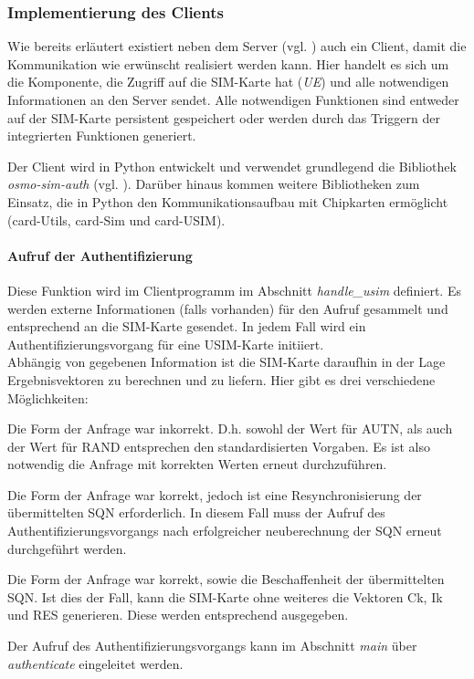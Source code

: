     \subsubsection{Implementierung des Clients}
    Wie bereits erläutert existiert neben dem Server (vgl. ) auch ein Client,
    damit die Kommunikation wie erwünscht realisiert werden kann. Hier handelt es sich um die Komponente,
    die Zugriff auf die SIM-Karte hat (\emph{UE}) und alle notwendigen Informationen an den Server sendet.
    Alle notwendigen Funktionen sind entweder auf der SIM-Karte persistent gespeichert oder werden durch
    das Triggern der integrierten Funktionen generiert.

    Der Client wird in Python entwickelt und verwendet grundlegend die Bibliothek \textit{osmo-sim-auth}
    (vgl. ). Darüber hinaus kommen weitere  Bibliotheken zum Einsatz, die in
    Python den Kommunikationsaufbau mit Chipkarten ermöglicht (card-Utils, card-Sim und card-USIM).

        \paragraph{Aufruf der Authentifizierung} Diese Funktion wird im Clientprogramm im Abschnitt
        \textit{handle\_usim} definiert. Es werden externe Informationen (falls vorhanden) für den Aufruf
        gesammelt und entsprechend an die SIM-Karte gesendet. In jedem Fall wird ein Authentifizierungsvorgang
        für eine USIM-Karte initiiert. \\
        Abhängig von gegebenen Information ist die SIM-Karte daraufhin in der Lage Ergebnisvektoren
        zu berechnen und zu liefern. Hier gibt es drei verschiedene Möglichkeiten:
            \begin{addmargin}[1em]{2em}
            Die Form der Anfrage war inkorrekt. D.h. sowohl der Wert für AUTN, als auch der Wert für RAND entsprechen
            den standardisierten Vorgaben. Es ist also notwendig die Anfrage mit korrekten Werten erneut
            durchzuführen.

            Die Form der Anfrage war korrekt, jedoch ist eine Resynchronisierung der übermittelten SQN erforderlich.
            In diesem Fall muss der Aufruf des Authentifizierungsvorgangs nach erfolgreicher neuberechnung der SQN
            erneut durchgeführt werden.

            Die Form der Anfrage war korrekt, sowie die Beschaffenheit der übermittelten SQN. Ist dies der Fall,
            kann die SIM-Karte ohne weiteres die Vektoren Ck, Ik und RES generieren. Diese werden entsprechend
            ausgegeben.
            \end{addmargin}
        Der Aufruf des Authentifizierungsvorgangs kann im Abschnitt \textit{main} über \textit{authenticate}
        eingeleitet werden.


